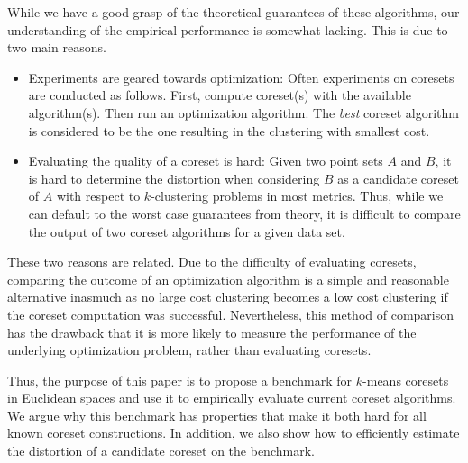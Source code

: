 While we have a good grasp of the theoretical guarantees of these algorithms, our understanding of the empirical performance is somewhat lacking.
This is due to two main reasons.
\begin{itemize}
\item Experiments are geared towards optimization: Often experiments on coresets are conducted as follows. First, compute coreset(s) with the available algorithm(s). Then run an optimization algorithm. The \emph{best} coreset algorithm is considered to be the one resulting in the clustering with smallest cost. 
\item Evaluating the quality of a coreset is hard: Given two point sets $A$ and $B$, it is hard to determine the distortion when considering $B$ as a candidate coreset of $A$ with respect to $k$-clustering problems in most metrics. Thus, while we can default to the worst case guarantees from theory, it is difficult to compare the output of two coreset algorithms for a given data set.
\end{itemize}

These two reasons are related. Due to the difficulty of evaluating coresets, comparing the outcome of an optimization algorithm is a simple and reasonable alternative inasmuch as no large cost clustering becomes a low cost clustering if the coreset computation was successful. Nevertheless, this method of comparison has the drawback that it is more likely to measure the performance of the underlying optimization problem, rather than evaluating coresets.

Thus, the purpose of this paper is to propose a benchmark for $k$-means coresets in Euclidean spaces and use it to empirically evaluate current coreset algorithms.
We argue why this benchmark has properties that make it both hard for all known coreset constructions. In addition, we also show how to efficiently estimate the distortion of a candidate coreset on the benchmark.

